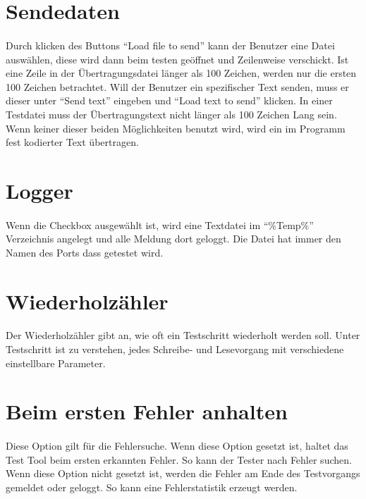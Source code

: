 \section{Sendedaten}
\paragraph{}
Durch klicken des Buttons "`Load file to send"' kann der Benutzer eine Datei auswählen, diese wird dann beim testen geöffnet und Zeilenweise verschickt. Ist eine Zeile in der Übertragungsdatei länger als 100 Zeichen, werden nur die ersten 100 Zeichen betrachtet. Will der Benutzer ein spezifischer Text senden, muss er dieser unter "`Send text"' eingeben und "`Load text to send"' klicken. In einer Testdatei muss der Übertragungstext nicht länger als 100 Zeichen Lang sein. Wenn keiner dieser beiden Möglichkeiten benutzt wird, wird ein im Programm fest kodierter Text übertragen.

\section{Logger}
\paragraph{}
Wenn die Checkbox ausgewählt ist, wird eine Textdatei im "`\%Temp\%"' Verzeichnis angelegt und alle Meldung dort geloggt. Die Datei hat immer den Namen des Ports dass getestet wird.

\section{Wiederholzähler}
\paragraph{}
Der Wiederholzähler gibt an, wie oft ein Testschritt wiederholt werden soll. Unter Testschritt ist zu verstehen, jedes Schreibe- und Lesevorgang mit verschiedene einstellbare Parameter.

\section{Beim ersten Fehler anhalten}
\paragraph{}
Diese Option gilt für die Fehlersuche. Wenn diese Option gesetzt ist, haltet das Test Tool beim ersten erkannten Fehler. So kann der Tester nach Fehler suchen. Wenn diese Option nicht gesetzt ist, werden die Fehler am Ende des Testvorgangs gemeldet oder geloggt. So kann eine Fehlerstatistik erzeugt werden.


